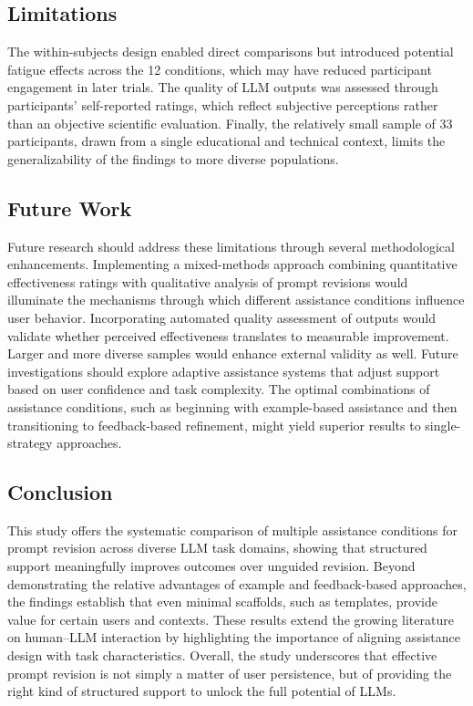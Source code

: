 \subsection {\textbf {Limitations}}
The within-subjects design enabled direct comparisons but introduced potential fatigue effects across the 12 conditions, which may have reduced participant engagement in later trials. The quality of LLM outputs was assessed through participants’ self-reported ratings, which reflect subjective perceptions rather than an objective scientific evaluation. Finally, the relatively small sample of 33 participants, drawn from a single educational and technical context, limits the generalizability of the findings to more diverse populations.

\subsection {\textbf {Future Work}}
Future research should address these limitations through several methodological enhancements. Implementing a mixed-methods approach combining quantitative effectiveness ratings with qualitative analysis of prompt revisions would illuminate the mechanisms through which different assistance conditions influence user behavior. Incorporating automated quality assessment of outputs would validate whether perceived effectiveness translates to measurable improvement. Larger and more diverse samples would enhance external validity as well. Future investigations should explore adaptive assistance systems that adjust support based on user confidence and task complexity. The optimal combinations of assistance conditions, such as beginning with example-based assistance and then transitioning to feedback-based refinement, might yield superior results to single-strategy approaches.

\subsection {\textbf {Conclusion}}
This study offers the systematic comparison of multiple assistance conditions for prompt revision across diverse LLM task domains, showing that structured support meaningfully improves outcomes over unguided revision. Beyond demonstrating the relative advantages of example and feedback-based approaches, the findings establish that even minimal scaffolds, such as templates, provide value for certain users and contexts. These results extend the growing literature on human–LLM interaction by highlighting the importance of aligning assistance design with task characteristics. Overall, the study underscores that effective prompt revision is not simply a matter of user persistence, but of providing the right kind of structured support to unlock the full potential of LLMs.
